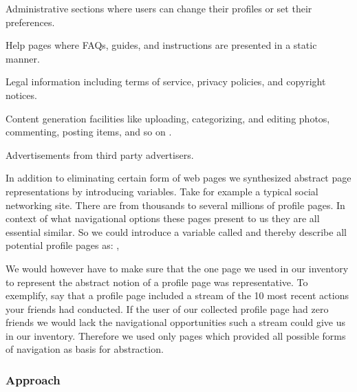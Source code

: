 \begin{desc}
  \item[Administrative sections] where users can change their profiles or set
    their preferences.
  \item[Help pages] where FAQs, guides, and instructions are presented in a
    static manner.
  \item[Legal information] including terms of service, privacy policies, and
    copyright notices.
  \item[Content generation] facilities like uploading, categorizing, and
    editing photos, commenting, posting items, and so on%
    .
  \item[Advertisements] from third party advertisers.
\end{desc}

In addition to eliminating certain form of web pages we synthesized abstract
page representations by introducing variables. Take for example a typical
social networking site. There are from thousands to several millions of
profile pages. In context of what navigational options these pages present to
us they are all essential similar. So we could introduce a variable called
%
and thereby describe all potential profile pages as:
,

We would however have to make sure that the one page we used in our inventory
to represent the abstract notion of a profile page was representative. To
exemplify, say that a profile page included a stream of the 10 most recent
actions your friends had conducted. If the user of our collected profile page
had zero friends we would lack the navigational opportunities such a stream
could give us in our inventory. Therefore we used only pages which provided
all possible forms of navigation as basis for abstraction.

\subsubsection{Approach}

